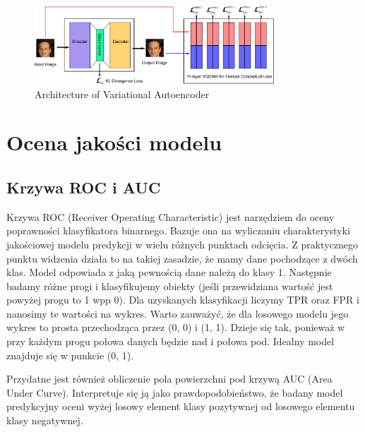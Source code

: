 \begin{figure}[h!]
    \centering
    \includegraphics[width=0.8\textwidth]{images/dfc_vae}
    \caption{Architecture of Variational Autoencoder}
    \label{fig:dfc_vae}
\end{figure}

\section{Ocena jakości modelu}

\subsection{Krzywa ROC i AUC}

Krzywa ROC (Receiver Operating Characteristic) jest narzędziem do oceny poprawności klasyfikatora binarnego. Bazuje ona na wyliczaniu charakterystyki jakościowej modelu predykcji w wielu różnych punktach odcięcia. Z praktycznego punktu widzenia działa to na takiej zasadzie, że mamy dane pochodzące z dwóch klas. Model odpowiada z jaką pewnością dane należą do klasy 1. Następnie badamy różne progi i klasyfikujemy obiekty (jeśli przewidziana wartość jest powyżej progu to 1 wpp 0). Dla uzyskanych klasyfikacji liczymy TPR oraz FPR i nanosimy te wartości na wykres. Warto zauważyć, że dla losowego modelu jego wykres to prosta przechodząca przez (0, 0) i (1, 1). Dzieje się tak, ponieważ w przy każdym progu połowa danych będzie nad i połowa pod. Idealny model znajduje się w punkcie (0, 1).

Przydatne jest również obliczenie pola powierzchni pod krzywą AUC (Area Under Curve). Interpretuje się ją jako prawdopodobieństwo, że badany model predykcyjny oceni wyżej losowy element klasy pozytywnej od losowego elementu klasy negatywnej.
